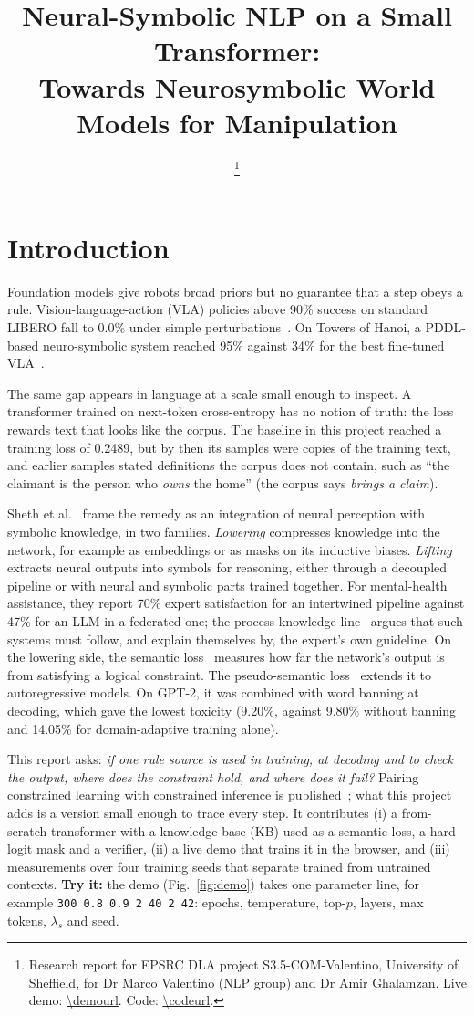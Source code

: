 \documentclass[letterpaper, 10pt, conference]{IEEEtran}
\title{\LARGE\bf Neural-Symbolic NLP on a Small Transformer:\\Towards Neurosymbolic World Models for Manipulation}
\author{\applicant\thanks{Research report for EPSRC DLA project S3.5-COM-Valentino, University of Sheffield, for Dr Marco Valentino (NLP group) and Dr Amir Ghalamzan. Live demo: \url{\demourl}. Code: \url{\codeurl}.}}
\begin{document}
\maketitle
\thispagestyle{empty}
\pagestyle{empty}

\section{Introduction}
Foundation models give robots broad priors but no guarantee that a step obeys a rule. Vision-language-action (VLA) policies above 90\% success on standard LIBERO fall to 0.0\% under simple perturbations~\cite{liberopro}. On Towers of Hanoi, a PDDL-based neuro-symbolic system reached 95\% against 34\% for the best fine-tuned VLA~\cite{duggan}.

The same gap appears in language at a scale small enough to inspect. A transformer trained on next-token cross-entropy has no notion of truth: the loss rewards text that looks like the corpus. The baseline in this project reached a training loss of 0.2489, but by then its samples were copies of the training text, and earlier samples stated definitions the corpus does not contain, such as ``the claimant is the person who \emph{owns} the home'' (the corpus says \emph{brings a claim}).

Sheth et al.~\cite{sheth2023} frame the remedy as an integration of neural perception with symbolic knowledge, in two families. \emph{Lowering} compresses knowledge into the network, for example as embeddings or as masks on its inductive biases. \emph{Lifting} extracts neural outputs into symbols for reasoning, either through a decoupled pipeline or with neural and symbolic parts trained together. For mental-health assistance, they report 70\% expert satisfaction for an intertwined pipeline against 47\% for an LLM in a federated one; the process-knowledge line~\cite{sheth2022,roy2022} argues that such systems must follow, and explain themselves by, the expert's own guideline. On the lowering side, the semantic loss~\cite{xu2018} measures how far the network's output is from satisfying a logical constraint. The pseudo-semantic loss~\cite{ahmed2023} extends it to autoregressive models. On GPT-2, it was combined with word banning at decoding, which gave the lowest toxicity (9.20\%, against 9.80\% without banning and 14.05\% for domain-adaptive training alone).

This report asks: \emph{if one rule source is used in training, at decoding and to check the output, where does the constraint hold, and where does it fail?} Pairing constrained learning with constrained inference is published~\cite{ahmed2023}; what this project adds is a version small enough to trace every step. It contributes (i) a from-scratch transformer with a knowledge base (KB) used as a semantic loss, a hard logit mask and a verifier, (ii) a live demo that trains it in the browser, and (iii) measurements over four training seeds that separate trained from untrained contexts. \textbf{Try it:} the demo (Fig.~\ref{fig:demo}) takes one parameter line, for example \texttt{300 0.8 0.9 2 40 2 42}: epochs, temperature, top-$p$, layers, max tokens, $\lambda_s$ and seed.
\end{document}
